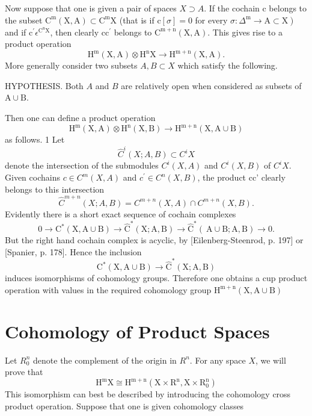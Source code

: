 \documentclass[10pt]{article}
\begin{document}
Now suppose that one is given a pair of spaces $X \supset A$. If the cochain c belongs to the subset $\mathrm{C}^{\mathrm{m}}(\mathrm{X}, \mathrm{A}) \subset \mathrm{C}^{\mathrm{m}} \mathrm{X}$ (that is if $\mathrm{c}[\sigma]=0$ for every $\left.\sigma: \Delta^{\mathrm{m}} \rightarrow \mathrm{A} \subset \mathrm{X}\right)$ and if $\mathrm{c}^{\prime} \epsilon^{\mathrm{C}^{\mathrm{n}} \mathrm{X}}$, then clearly $\mathrm{cc}^{\prime}$ belongs to $\mathrm{C}^{\mathrm{m}+\mathrm{n}}(\mathrm{X}, \mathrm{A})$. This gives rise to a product operation
$$
\mathrm{H}^{\mathrm{m}}(\mathrm{X}, \mathrm{A}) \otimes \mathrm{H}^{\mathrm{n}} \mathrm{X} \rightarrow \mathrm{H}^{\mathrm{m}+\mathrm{n}}(\mathrm{X}, \mathrm{A}) .
$$
More generally consider two subsets $A, B \subset X$ which satisfy the following.

HYPOTHESIS. Both $A$ and $B$ are relatively open when considered as subsets of $\mathrm{A} \cup \mathrm{B}$.

Then one can define a product operation
$$
\mathrm{H}^{\mathrm{m}}(\mathrm{X}, \mathrm{A}) \otimes \mathrm{H}^{\mathrm{n}}(\mathrm{X}, \mathrm{B}) \rightarrow \mathrm{H}^{\mathrm{m}+\mathrm{n}}(\mathrm{X}, \mathrm{A} \cup \mathrm{B})
$$
as follows. 1 Let
$$
\widehat{C}^{i}(X ; A, B) \subset C^{i} X
$$
denote the intersection of the submodules $C^{i}(X, A)$ and $C^{i}(X, B)$ of $C^{i} X$. Given cochains $c \in C^{m}(X, A)$ and $c^{\prime} \in C^{n}(X, B)$, the product cc' clearly belongs to this intersection
$$
\hat{C}^{m+n}(X ; A, B)=C^{m+n}(X, A) \cap C^{m+n}(X, B) .
$$
Evidently there is a short exact sequence of cochain complexes
$$
0 \rightarrow \mathrm{C}^{*}(\mathrm{X}, \mathrm{A} \cup \mathrm{B}) \rightarrow \widehat{\mathrm{C}}^{*}(\mathrm{X} ; \mathrm{A}, \mathrm{B}) \rightarrow \widehat{\mathrm{C}}^{*}(\mathrm{~A} \cup \mathrm{B} ; \mathrm{A}, \mathrm{B}) \rightarrow 0 .
$$
But the right hand cochain complex is acyclic, by [Eilenberg-Steenrod, p. 197] or [Spanier, p. 178]. Hence the inclusion
$$
\mathrm{C}^{*}(\mathrm{X}, \mathrm{A} \cup \mathrm{B}) \rightarrow \widehat{\mathrm{C}}^{*}(\mathrm{X} ; \mathrm{A}, \mathrm{B})
$$
induces isomorphisms of cohomology groups. Therefore one obtains a cup product operation with values in the required cohomology group $\mathrm{H}^{\mathrm{m}+\mathrm{n}}(\mathrm{X}, \mathrm{A} \cup \mathrm{B})$

\section{Cohomology of Product Spaces}
Let $R_{0}^{n}$ denote the complement of the origin in $R^{n}$. For any space $X$, we will prove that
$$
\mathrm{H}^{\mathrm{m}} \mathrm{X} \cong \mathrm{H}^{\mathrm{m}+\mathrm{n}}\left(\mathrm{X} \times \mathrm{R}^{\mathrm{n}}, \mathrm{X} \times \mathrm{R}_{0}^{\mathrm{n}}\right)
$$
This isomorphism can best be described by introducing the cohomology cross product operation. Suppose that one is given cohomology classes
\end{document}
